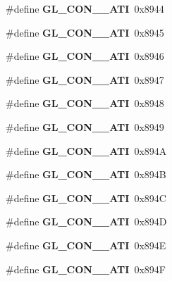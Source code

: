 \begin{DoxyCompactItemize}
\item 
\#define {\bfseries G\+L\+\_\+\+C\+O\+N\+\_\+\_\+\+A\+T\+I}~0x8944\label{_s_d_l__opengl_8h_a9790a78e29fa264bb43d1c76ac3c8451}

\item 
\#define {\bfseries G\+L\+\_\+\+C\+O\+N\+\_\+\_\+\+A\+T\+I}~0x8945\label{_s_d_l__opengl_8h_abbd5a83013f2d13c3f465f308d57f44d}

\item 
\#define {\bfseries G\+L\+\_\+\+C\+O\+N\+\_\+\_\+\+A\+T\+I}~0x8946\label{_s_d_l__opengl_8h_a9587099e426acd5e70ae8062e0f529f3}

\item 
\#define {\bfseries G\+L\+\_\+\+C\+O\+N\+\_\+\_\+\+A\+T\+I}~0x8947\label{_s_d_l__opengl_8h_ad0d9b75e4af2e6c5969899458b6d6463}

\item 
\#define {\bfseries G\+L\+\_\+\+C\+O\+N\+\_\+\_\+\+A\+T\+I}~0x8948\label{_s_d_l__opengl_8h_a15e7c6c9ff3bf1ef82c635f84fa0a9b7}

\item 
\#define {\bfseries G\+L\+\_\+\+C\+O\+N\+\_\+\_\+\+A\+T\+I}~0x8949\label{_s_d_l__opengl_8h_a2dd91c2de470450d355158f8f5e4afa3}

\item 
\#define {\bfseries G\+L\+\_\+\+C\+O\+N\+\_\+\_\+\+A\+T\+I}~0x894\+A\label{_s_d_l__opengl_8h_ac9b540292764f9cd11a78db57db153ca}

\item 
\#define {\bfseries G\+L\+\_\+\+C\+O\+N\+\_\+\_\+\+A\+T\+I}~0x894\+B\label{_s_d_l__opengl_8h_af944606909c6f17017711c86b6e5f89b}

\item 
\#define {\bfseries G\+L\+\_\+\+C\+O\+N\+\_\+\_\+\+A\+T\+I}~0x894\+C\label{_s_d_l__opengl_8h_afaf0e358d6316676266a86b0475e7290}

\item 
\#define {\bfseries G\+L\+\_\+\+C\+O\+N\+\_\+\_\+\+A\+T\+I}~0x894\+D\label{_s_d_l__opengl_8h_a87fca123944a42b5865c336e3517c4eb}

\item 
\#define {\bfseries G\+L\+\_\+\+C\+O\+N\+\_\+\_\+\+A\+T\+I}~0x894\+E\label{_s_d_l__opengl_8h_a5ff44f04e1f6c8eb6581f0d657d53d96}

\item 
\#define {\bfseries G\+L\+\_\+\+C\+O\+N\+\_\+\_\+\+A\+T\+I}~0x894\+F\label{_s_d_l__opengl_8h_ad126ae03ea8912040985f8882e487e79}


\end{DoxyCompactItemize}
